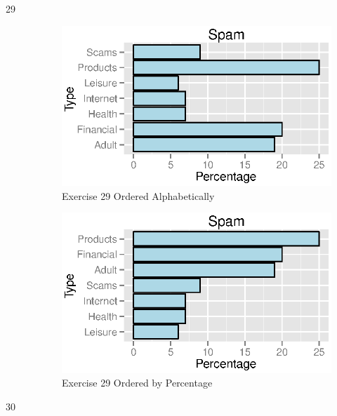 \documentclass{exam}
\begin{document}
\begin{description}
      \item[29]
        \begin{figure}[H]
          \centering
          \includegraphics{figures/ex29a.eps}
          \caption{Exercise 29 Ordered Alphabetically}
        \end{figure}

        \begin{figure}[H]
          \centering
          \includegraphics{figures/ex29b.eps}
          \caption{Exercise 29 Ordered by Percentage}
        \end{figure}

      \item[30]
\end{description}
\end{document}
